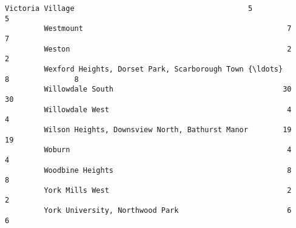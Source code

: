 \documentclass[11pt]{article}
\begin{document}
\begin{Verbatim}[commandchars=\\\{\}]
         Victoria Village                                        5               5   
         Westmount                                               7               7   
         Weston                                                  2               2   
         Wexford Heights, Dorset Park, Scarborough Town {\ldots}      8               8   
         Willowdale South                                       30              30   
         Willowdale West                                         4               4   
         Wilson Heights, Downsview North, Bathurst Manor        19              19   
         Woburn                                                  4               4   
         Woodbine Heights                                        8               8   
         York Mills West                                         2               2   
         York University, Northwood Park                         6               6   
         

\end{Verbatim}
\end{document}
